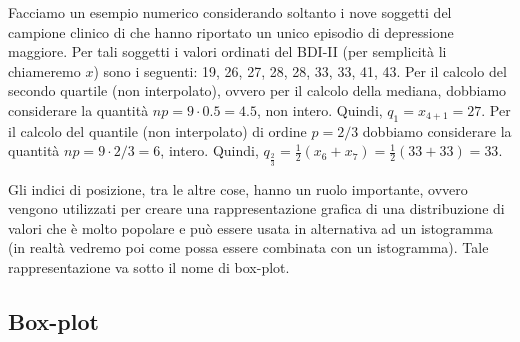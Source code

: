 Facciamo un esempio numerico considerando soltanto i nove soggetti del campione clinico di \citet{zetsche_future_2019} che hanno riportato un unico episodio di depressione maggiore.
Per tali soggetti i valori ordinati del BDI-II (per semplicità li chiameremo $x$) sono i seguenti: 19, 26, 27, 28, 28, 33, 33, 41, 43.
Per il calcolo del secondo quartile (non interpolato), ovvero per il calcolo della mediana, dobbiamo considerare la quantità $np = 9 \cdot 0.5 = 4.5$, non intero.
Quindi, $q_1 = x_{4 + 1} = 27$.
Per il calcolo del quantile (non interpolato) di ordine $p = 2/3$ dobbiamo considerare la quantità $np = 9 \cdot 2/3 = 6$, intero.
Quindi, $q_{\frac{2}{3}} = \frac{1}{2} (x_{6} + x_{7}) = \frac{1}{2} (33 + 33) = 33$. 

Gli indici di posizione, tra le altre cose, hanno un ruolo importante, ovvero vengono utilizzati per creare una rappresentazione grafica di una distribuzione di valori che è molto popolare e può essere usata in alternativa ad un istogramma (in realtà vedremo poi come possa essere combinata con un istogramma).
Tale rappresentazione va sotto il nome di box-plot.


\subsection{Box-plot}

